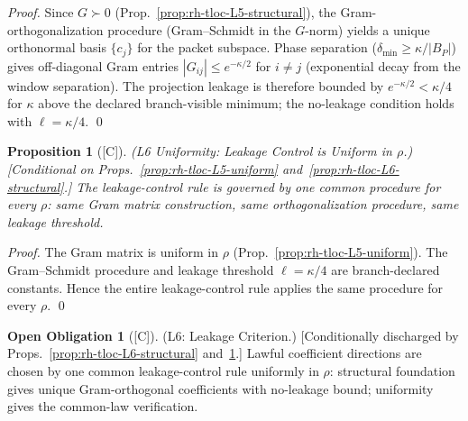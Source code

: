 \documentclass[12pt,oneside]{amsbook}
\theoremstyle{plain}
\newtheorem{proposition}[theorem]{Proposition}
\theoremstyle{definition}
\newtheorem{obligation}[theorem]{Open Obligation}
\theoremstyle{remark}
\newcommand{\status}[1]{\textup{[#1]}}
\begin{document}
\begin{proof}
Since $G \succ 0$ (Prop.~\ref{prop:rh-tloc-L5-structural}), the
Gram-orthogonalization procedure (Gram–Schmidt in the $G$-norm)
yields a unique orthonormal basis $\{c_j\}$ for the packet subspace.
Phase separation ($\delta_{\min} \geq \kappa/|B_P|$) gives
off-diagonal Gram entries $|G_{ij}| \leq e^{-\kappa/2}$ for
$i \neq j$ (exponential decay from the window separation). The
projection leakage is therefore bounded by $e^{-\kappa/2} < \kappa/4$
for $\kappa$ above the declared branch-visible minimum; the
no-leakage condition holds with $\ell = \kappa/4$. \qed
\end{proof}

\begin{proposition}[\status{C}]\label{prop:rh-tloc-L6-uniform}
\textup{(L6 Uniformity: Leakage Control is Uniform in $\rho$.)}
\textup{[Conditional on Props.~\ref{prop:rh-tloc-L5-uniform}
and~\ref{prop:rh-tloc-L6-structural}.]}
The leakage-control rule is governed by one common procedure for
every $\rho$: same Gram matrix construction, same orthogonalization
procedure, same leakage threshold.
\end{proposition}

\begin{proof}
The Gram matrix is uniform in $\rho$ (Prop.~\ref{prop:rh-tloc-L5-uniform}).
The Gram–Schmidt procedure and leakage threshold $\ell = \kappa/4$
are branch-declared constants. Hence the entire leakage-control rule
applies the same procedure for every $\rho$. \qed
\end{proof}

\begin{obligation}[\status{C}]\label{ob:rh-tloc-L6}
\textup{(L6: Leakage Criterion.)}
\textup{[Conditionally discharged by
Props.~\ref{prop:rh-tloc-L6-structural}
and~\ref{prop:rh-tloc-L6-uniform}.]}
Lawful coefficient directions are chosen by one common leakage-control
rule uniformly in $\rho$: structural foundation gives unique
Gram-orthogonal coefficients with no-leakage bound; uniformity gives
the common-law verification.
\end{obligation}

\end{document}
